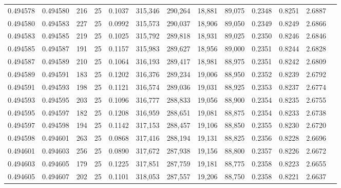 \begin{tabular}{rrrrrrrrrrrrr}
0.494578 & 0.494580 &   216 &  25 &                                     0.1037 & 315,346 & 290,264 &  18,881 &  89,075 & 0.2348 & 0.8251 & 2.6887 \\
0.494580 & 0.494583 &   227 &  25 &                                     0.0992 & 315,573 & 290,037 &  18,906 &  89,050 & 0.2349 & 0.8249 & 2.6866 \\
0.494583 & 0.494585 &   219 &  25 &                                     0.1025 & 315,792 & 289,818 &  18,931 &  89,025 & 0.2350 & 0.8246 & 2.6846 \\
0.494585 & 0.494587 &   191 &  25 &                                     0.1157 & 315,983 & 289,627 &  18,956 &  89,000 & 0.2351 & 0.8244 & 2.6828 \\
0.494587 & 0.494589 &   210 &  25 &                                     0.1064 & 316,193 & 289,417 &  18,981 &  88,975 & 0.2351 & 0.8242 & 2.6809 \\
0.494589 & 0.494591 &   183 &  25 &                                     0.1202 & 316,376 & 289,234 &  19,006 &  88,950 & 0.2352 & 0.8239 & 2.6792 \\
0.494591 & 0.494593 &   198 &  25 &                                     0.1121 & 316,574 & 289,036 &  19,031 &  88,925 & 0.2353 & 0.8237 & 2.6774 \\
0.494593 & 0.494595 &   203 &  25 &                                     0.1096 & 316,777 & 288,833 &  19,056 &  88,900 & 0.2354 & 0.8235 & 2.6755 \\
0.494595 & 0.494597 &   182 &  25 &                                     0.1208 & 316,959 & 288,651 &  19,081 &  88,875 & 0.2354 & 0.8233 & 2.6738 \\
0.494597 & 0.494598 &   194 &  25 &                                     0.1142 & 317,153 & 288,457 &  19,106 &  88,850 & 0.2355 & 0.8230 & 2.6720 \\
0.494598 & 0.494601 &   263 &  25 &                                     0.0868 & 317,416 & 288,194 &  19,131 &  88,825 & 0.2356 & 0.8228 & 2.6696 \\
0.494601 & 0.494603 &   256 &  25 &                                     0.0890 & 317,672 & 287,938 &  19,156 &  88,800 & 0.2357 & 0.8226 & 2.6672 \\
0.494603 & 0.494605 &   179 &  25 &                                     0.1225 & 317,851 & 287,759 &  19,181 &  88,775 & 0.2358 & 0.8223 & 2.6655 \\
0.494605 & 0.494607 &   202 &  25 &                                     0.1101 & 318,053 & 287,557 &  19,206 &  88,750 & 0.2358 & 0.8221 & 2.6637 \\

\end{tabular}
